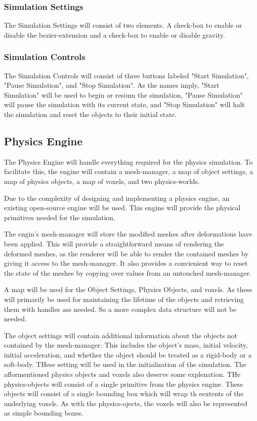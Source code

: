 \subsubsection{Simulation Settings}

The Simulation Settings will consist of two elements. A check-box to enable or disable the bezier-extension and a 
check-box to enable or disable gravity.

\subsubsection{Simulation Controls}

The Simulation Controls will consist of three buttons labeled "Start Simulation", "Pause Simulation", and 
"Stop Simulation". As the names imply, "Start Simulation" will be used to begin or resium the simulation, "Pause 
Simulation" will pause the simulation with its current state, and "Stop Simulation" will halt the simulation and 
reset the objects to their initial state.

\subsection{Physics Engine}

The Physics Engine will handle everything required for the physics simulation. To facilitate this, the engine will 
contain a mesh-manager, a map of object settings, a map of physics objects, a map of voxels, and two physics-worlds.

Due to the complexity of designing and implementing a physics engine, an existing open-source engine will be used.
This engine will provide the physical primitives needed for the simulation.

The engin's mesh-manager will store the modified meshes after deformations have been applied. This will provide a
straightforward means of rendering the deformed meshes, as the renderer will be able to render the contained 
meshes by giving it access to the mesh-manager. It also provides a convienient way to reset the state of the meshes by
copying over values from an untouched mesh-manager.

A map will be used for the Object Settings, Physics Objects, and voxels. As these will primarily be used for 
maintaining the lifetime of the objects and retrieving them with handles ass needed. So a more complex data structure 
will not be needed.

The object settings will contain additional information about the objects not contained by the mesh-manager. This 
includes the object's mass, initial velocity, initial acceleration, and whether the object should be treated as a 
rigid-body or a soft-body. THese setting will be used in the initialization of the simulation. The afformentioned
physics objects and voxels also deserve some explenation. THe physics-objects will consist of a single primitive
from the physics engine. These objects will consist of a single bounding box which will wrap th eextents of the
underlying voxels. As with the physics-ojects, the voxels will also be represented as simple bounding boxes. 

